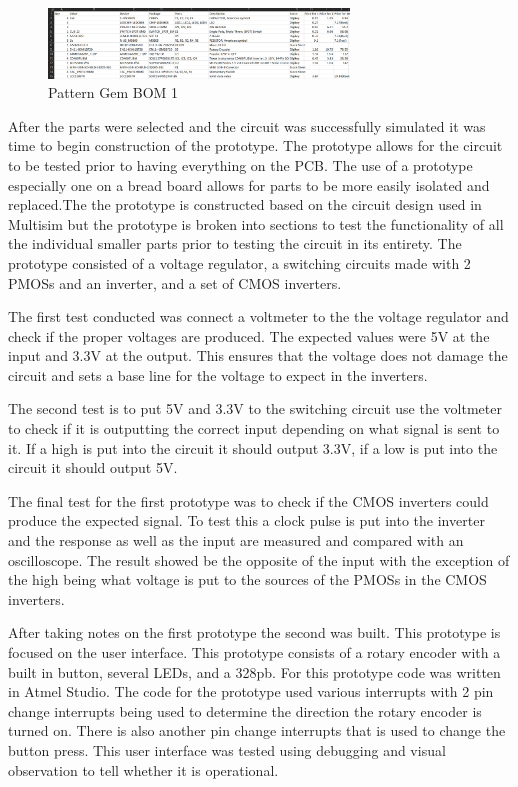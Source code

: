 \documentclass[12pt]{article}
\begin{document}
        \begin{figure}[htp]
            \centering
            \includegraphics[width=8cm]{BOM1.png}
            \caption{Pattern Gem BOM 1}
        \end{figure}

        \newpage

        \par After the parts were selected and the circuit was successfully simulated it was time to begin construction of the prototype. The prototype allows for the circuit to be tested prior to having everything on the PCB. The use of a prototype especially one on a bread board allows for parts to be more easily isolated and replaced.The the prototype is constructed based on the circuit design used in Multisim but the prototype is broken into sections to test the functionality of all the individual smaller parts prior to testing the circuit in its entirety. The prototype consisted of a voltage regulator, a switching circuits made with 2 PMOSs and an inverter, and a set of CMOS inverters.
        \par The first test conducted was connect a voltmeter to the the voltage regulator and check if the proper voltages are produced. The expected values were 5V at the input and 3.3V at the output. This ensures that the voltage does not damage the circuit and sets a base line for the voltage to expect in the inverters. 
        \par The second test is to put 5V and 3.3V to the switching circuit use the voltmeter to check if it is outputting the correct input depending on what signal is sent to it. If a high is put into the circuit it should output 3.3V, if a low is put into the circuit it should output 5V.
        \par The final test for the first prototype was to check if the CMOS inverters could produce the expected signal. To test this a clock pulse is put into the inverter and the response as well as the input are measured and compared with an oscilloscope. The result showed be the opposite of the input with the exception of the high being what voltage is put to the sources of the PMOSs in the CMOS inverters.
        \par After taking notes on the first prototype the second was built. This prototype is focused on the user interface. This prototype consists of a rotary encoder with a built in button, several LEDs, and a 328pb. For this prototype code was written in Atmel Studio. The code for the prototype used various interrupts with 2 pin change interrupts being used to determine the direction the rotary encoder is turned on. There is also another pin change interrupts that is used to change the button press. This user interface was tested using debugging and visual observation to tell whether it is operational. 
\end{document}
